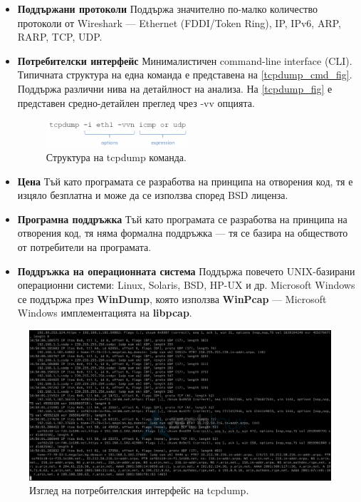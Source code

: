\documentclass[12pt,a4paper,oneside]{book}
\begin{document}
\begin{itemize}
  \item \textbf{Поддържани протоколи} Поддържа значително по-малко количество
    протоколи от Wireshark --- Ethernet (FDDI/Token Ring), IP, IPv6, ARP, RARP,
    TCP, UDP.
  \item \textbf{Потребителски интерфейс} Минималистичен command-line interface
    (CLI). Типичната структура на една команда е представена на
    \autoref{tcpdump_cmd_fig}. Поддържа различни нива на детайлност на анализа.
    На \autoref{tcpdump_fig} е представен средно-детайлен преглед чрез -vv
    опцията.

  \begin{figure}[h!]
    \centering
    \includegraphics[width=0.5\textwidth]{figures/tcpdump_cmd.png}
    \caption{Структура на tcpdump команда.}
    \label{tcpdump_cmd_fig}
  \end{figure}

  \item \textbf{Цена} Тъй като програмата се разработва на принципа на отворения
    код, тя е изцяло безплатна и може да се използва според BSD лиценза.
  \item \textbf{Програмна поддръжка} Тъй като програмата се разработва на
    принципа на отворения код, тя няма формална поддръжка --- тя се
    базира на обществото от потребители на програмата.
  \item \textbf{Поддръжка на операционната система} Поддържа повечето
    UNIX-базирани операционни системи: Linux, Solaris, BSD, HP-UX и др.
    Microsoft Windows се поддържа през \textbf{WinDump}, която използва
    \textbf{WinPcap} --- Microsoft Windows имплементацията на \textbf{libpcap}.
\end{itemize}


\begin{figure}[h!]
  \centering
  \includegraphics[width=1.0\textwidth]{figures/tcpdump.png}
  \caption{Изглед на потребителския интерфейс на tcpdump.}
  \label{tcpdump_fig}
\end{figure}
\end{document}
